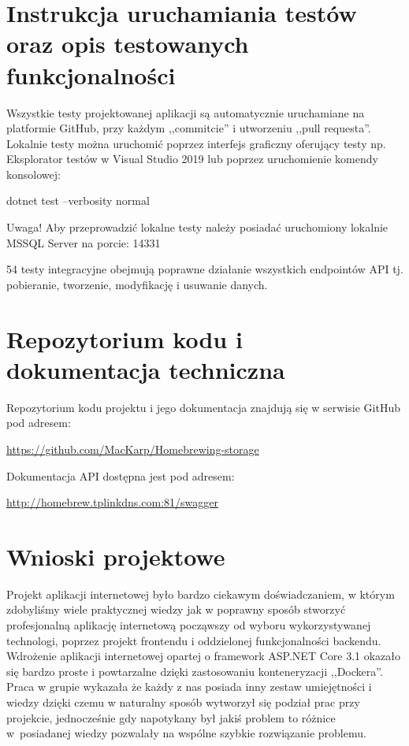 \documentclass[12pt,a4paper]{article}
\begin{document}
	\section{Instrukcja uruchamiania testów oraz opis testowanych funkcjonalności}
		\indent Wszystkie testy projektowanej aplikacji są automatycznie uruchamiane na platformie GitHub, przy każdym ,,commitcie'' i utworzeniu ,,pull requesta''.
			Lokalnie testy można uruchomić poprzez interfejs graficzny oferujący testy np. Eksplorator testów w Visual Studio 2019 lub poprzez uruchomienie komendy konsolowej:
				\begin{tcolorbox}[minipage,colback=white,arc=0pt,outer arc=0pt, fontupper=\scriptsize]
					dotnet test --verbosity normal
				\end{tcolorbox}
				\begin{tcolorbox}[minipage,colback=white,arc=0pt,outer arc=0pt, fontupper=\scriptsize]
					Uwaga! Aby przeprowadzić lokalne testy należy posiadać uruchomiony lokalnie MSSQL Server na porcie: 14331
				\end{tcolorbox}
				 54 testy integracyjne obejmują poprawne działanie wszystkich endpointów API tj. pobieranie, tworzenie, modyfikację i usuwanie danych.     
	\newpage
	
	\section{Repozytorium kodu i dokumentacja techniczna}
		\indent Repozytorium kodu projektu i jego dokumentacja znajdują się w serwisie GitHub pod adresem: 
			\begin{tcolorbox}[minipage,colback=white,arc=0pt,outer arc=0pt, fontupper=\scriptsize]
				\center									
				\url{https://github.com/MacKarp/Homebrewing-storage}
			\end{tcolorbox}
		\indent Dokumentacja API dostępna jest pod adresem:
				\begin{tcolorbox}[minipage,colback=white,arc=0pt,outer arc=0pt, fontupper=\scriptsize]
					\center					
					\url{http://homebrew.tplinkdns.com:81/swagger}
				\end{tcolorbox}
	\newpage
	
	\section{Wnioski projektowe}
		\indent Projekt aplikacji internetowej było bardzo ciekawym doświadczaniem, w którym zdobyliśmy wiele praktycznej wiedzy jak w poprawny sposób
			stworzyć profesjonalną aplikację internetową począwszy od wyboru wykorzystywanej technologi, poprzez projekt frontendu i oddzielonej funkcjonalności backendu.
			Wdrożenie aplikacji internetowej opartej o framework ASP.NET Core 3.1 okazało się bardzo proste i powtarzalne dzięki zastosowaniu konteneryzacji ,,Dockera''.
			Praca w grupie wykazała że każdy z nas posiada inny zestaw umiejętności i wiedzy dzięki czemu w naturalny sposób wytworzył się podział prac przy projekcie,
			jednocześnie gdy napotykany był jakiś problem to różnice w~posiadanej wiedzy pozwalały na wspólne szybkie rozwiązanie problemu. 
\end{document}
